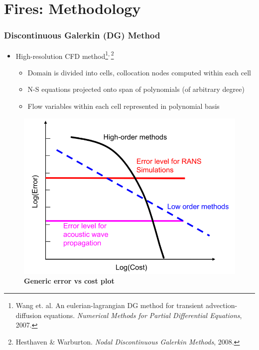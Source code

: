 \documentclass[9pt]{beamer}
\begin{document}
\section{Fires: Methodology}
\label{sec-6}
\begin{frame}
\frametitle{Discontinuous Galerkin (DG) Method}
\label{sec-6-1}

\begin{itemize}
\item High-resolution CFD method\footnote{Wang et. al. An eulerian-lagrangian DG method for transient advection-diffusion equations. \emph{Numerical Methods for Partial Differential Equations}, 2007.
 }\textsuperscript{,}\,\footnote{Hesthaven \& Warburton. \emph{Nodal Discontinuous Galerkin Methods}, 2008.
 }
\begin{itemize}
\item Domain is divided into cells, collocation nodes computed within each cell
\item N-S equations projected onto span of polynomials (of arbitrary degree)
\item Flow variables within each cell represented in polynomial basis
\end{itemize}
\end{itemize}
\begin{figure}
\includegraphics[width=0.5\linewidth]{errorvscostzj.png} \\
\textbf{Generic error vs cost plot}
\end{figure}
\end{frame}
\end{document}
